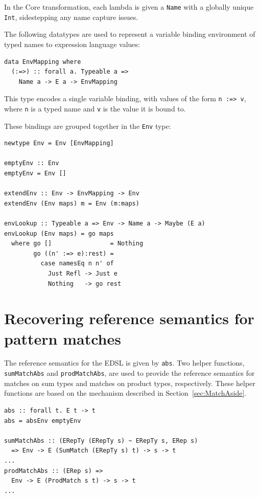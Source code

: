 \documentclass[runningheads, a4paper]{llncs}
\newcommand{\ttt}{\texttt}
\begin{document}
\noindent In the Core transformation, each lambda is given a \ttt{Name} with a globally
unique \ttt{Int}, sidestepping any name capture issues.

The following datatypes are used to represent a variable binding environment
of typed names to expression language values:

\begin{lstlisting}
data EnvMapping where
  (:=>) :: forall a. Typeable a =>
    Name a -> E a -> EnvMapping
\end{lstlisting}

\noindent This type encodes a single variable binding, with values of the form
\ttt{n :=> v}, where \ttt{n} is a typed name and \ttt{v} is the value it is bound to.

These bindings are grouped together in the \ttt{Env} type:
\begin{lstlisting}
newtype Env = Env [EnvMapping]

emptyEnv :: Env
emptyEnv = Env []

extendEnv :: Env -> EnvMapping -> Env
extendEnv (Env maps) m = Env (m:maps)

envLookup :: Typeable a => Env -> Name a -> Maybe (E a)
envLookup (Env maps) = go maps
  where go []                = Nothing
        go ((n' :=> e):rest) =
          case namesEq n n' of
            Just Refl -> Just e
            Nothing   -> go rest
\end{lstlisting}


\section{Recovering reference semantics for pattern matches}
\label{sec:StdSemantics}

The reference semantics for the EDSL is given by \ttt{abs}. Two helper
functions, \ttt{sumMatchAbs} and \ttt{prodMatchAbs}, are used to provide
the reference semantics for matches on sum types and matches on product
types, respectively. These helper functions are based on the mechanism
described in Section~\ref{sec:MatchAside}.

\begin{lstlisting}
abs :: forall t. E t -> t
abs = absEnv emptyEnv

sumMatchAbs :: (ERepTy (ERepTy s) ~ ERepTy s, ERep s)
  => Env -> E (SumMatch (ERepTy s) t) -> s -> t
...
prodMatchAbs :: (ERep s) =>
  Env -> E (ProdMatch s t) -> s -> t
...
\end{lstlisting}
\end{document}
